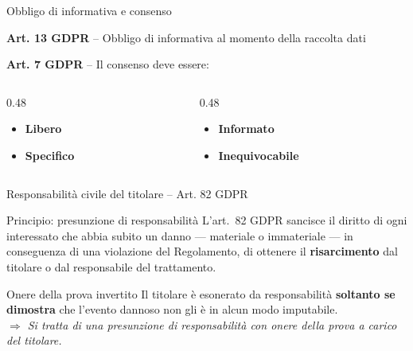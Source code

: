 \documentclass[aspectratio=169]{beamer}
\begin{document}
\begin{frame}{Obbligo di informativa e consenso}

  \textbf{Art. 13 GDPR} -- Obbligo di informativa al momento della raccolta dati

  \vspace{0.3cm}
  \textbf{Art. 7 GDPR} -- Il consenso deve essere:

  \vspace{0.2cm}
  \begin{columns}[T]
    \begin{column}{0.48\textwidth}
      \begin{itemize}
        \item[\textbf{1.}] \textbf{Libero}
        \item[\textbf{2.}] \textbf{Specifico}
      \end{itemize}
    \end{column}
    \begin{column}{0.48\textwidth}
      \begin{itemize}
        \item[\textbf{3.}] \textbf{Informato}
        \item[\textbf{4.}] \textbf{Inequivocabile}
      \end{itemize}
    \end{column}
  \end{columns}
\end{frame}

\begin{frame}{Responsabilità civile del titolare -- Art. 82 GDPR}

  \begin{block}{Principio: presunzione di responsabilità}
    L'art.~82 GDPR sancisce il diritto di ogni interessato che abbia subito un danno --- materiale o immateriale --- in conseguenza di una violazione del Regolamento, di ottenere il \textbf{risarcimento} dal titolare o dal responsabile del trattamento.
  \end{block}

  \vspace{0.4cm}
  \begin{alertblock}{Onere della prova invertito}
    Il titolare è esonerato da responsabilità \textbf{soltanto se dimostra} che l'evento dannoso non gli è in alcun modo imputabile.\\[0.3em]
    \small \emph{$\Rightarrow$ Si tratta di una presunzione di responsabilità con onere della prova a carico del titolare.}
  \end{alertblock}

\end{frame}
\end{document}
